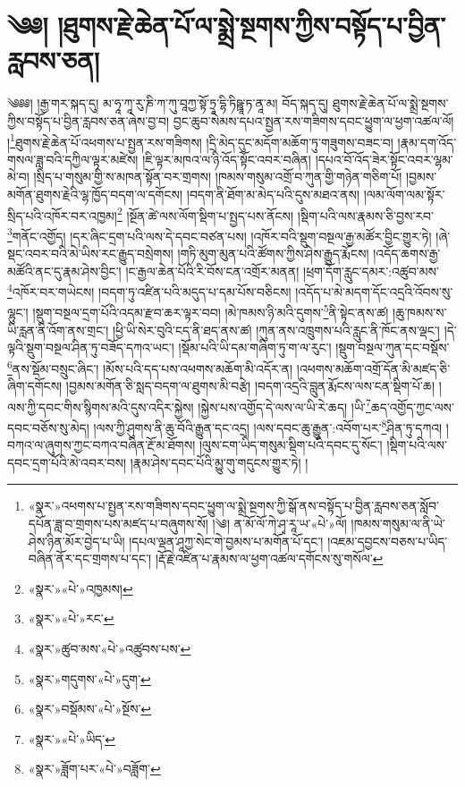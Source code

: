 \chapter{༄༅། །ཐུགས་རྗེ་ཆེན་པོ་ལ་སྨྲེ་སྔགས་ཀྱིས་བསྟོད་པ་བྱིན་རླབས་ཅན།}༄༅༅། །རྒྱ་གར་སྐད་དུ། མ་ཧཱ་ཀཱ་རུ་ཎི་ཀ་ཀུ་བཱཀྱ་སྟོ་ཏྲཱ་དྷི་ཏིཥྛཱ་ཏ་ནཱ་མ། བོད་སྐད་དུ། ཐུགས་རྗེ་ཆེན་པོ་ལ་སྨྲེ་སྔགས་ཀྱིས་བསྟོད་པ་བྱིན་རླབས་ཅན་ཞེས་བྱ་བ། བྱང་ཆུབ་སེམས་དཔའ་སྤྱན་རས་གཟིགས་དབང་ཕྱུག་ལ་ཕྱག་འཚལ་ལོ། །\footnote{«སྣར་»འཕགས་པ་སྤྱན་རས་གཟིགས་དབང་ཕྱུག་ལ་སྨྲེ་སྔགས་ཀྱི་སྒོ་ནས་བསྟོད་པ་བྱིན་རླབས་ཅན་སློབ་དཔོན་ཟླ་བ་གྲགས་པས་མཛད་པ་བཞུགས་སོ། །༄། ན་མོ་ལོ་ཀེ་ཤྭ་རཱ་ཡ་«པེ་»ལོ། །ཁམས་གསུམ་ལ་ནི་ཡེ་ཤེས་ཉིན་མོར་བྱེད་པ་ཡི། །དཔལ་ལྡན་ཤཱཀྱ་སེང་གེ་བྱམས་པ་མགོན་པོ་དང་། །འཇམ་དབྱངས་བཅས་པ་ཡིད་བཞིན་ནོར་དང་གྲགས་པ་དང་། །རྡོ་རྗེ་འཛིན་པ་རྣམས་ལ་ཕྱག་འཚལ་དགོངས་སུ་གསོལ་}ཐུགས་རྗེ་ཆེན་པོ་འཕགས་པ་སྤྱན་རས་གཟིགས། །དྲི་མེད་དུང་མདོག་མཆོག་ཏུ་གཟུགས་བཟང་བ། །རྣམ་དག་འོད་གསལ་ཟླ་བའི་དཀྱིལ་ལྟར་མཛེས། །ཇི་ལྟར་མཁའ་ལ་ཉི་འོད་སྟོང་འབར་བཞིན། །དཔའ་བོ་འོད་ཟེར་སྟོང་འབར་ལྷམ་མེ་བ། །སྲིད་པ་གསུམ་གྱི་ས་མཁན་སྟོན་བར་གྲགས། །ཁམས་གསུམ་འགྲོ་བ་ཀུན་གྱི་གཉེན་གཅིག་པོ། །བྱམས་མགོན་ཐུགས་རྗེའི་ལྷ་ཁྱོད་བདག་ལ་དགོངས། །བདག་ནི་ཐོག་མ་མེད་པའི་དུས་མཐའ་ནས། །ལམ་ལོག་ལམ་སྟོར་སྲིད་པའི་འཁོར་བར་འཁྱམ།\footnote{«སྣར་»«པེ་»འཁྱམས།} །སྔོན་ཚེ་ལས་ལོག་སྡིག་པ་སྤྱད་པས་ནོངས། །སྡིག་པའི་ལས་རྣམས་ཅི་བྱས་རབ་\footnote{«སྣར་»«པེ་»རང་}གནོང་འགྱོད། །དར་ཞིང་དྲག་པའི་ལས་དེ་དབང་བཙན་པས། །འཁོར་བའི་སྡུག་བསྔལ་རྒྱ་མཚོར་བྱིང་གྱུར་ཏེ། །ཞེ་སྡང་འབར་བའི་མེ་ཡིས་རང་རྒྱུད་བསྲེགས། །གཏི་མུག་མུན་པའི་ཚོགས་ཀྱིས་ཤེས་རྒྱུད་རྨོངས། །འདོད་ཆགས་རྒྱ་མཚོའི་ནང་དུ་རྣམ་ཤེས་བྱིང་། །ང་རྒྱལ་ཆེན་པོའི་རི་བོས་ངན་འགྲོར་མནན། །ཕྲག་དོག་རླུང་དམར་:འཚུབ་མས་\footnote{«སྣར་»ཚུབ་མས་«པེ་»འཚུབས་པས་}འཁོར་བར་གཡེངས། །བདག་ཏུ་འཛིན་པའི་མདུད་པ་དམ་པོས་བཅིངས། །འདོད་པ་མེ་མདག་དོང་འདྲའི་འོབས་སུ་ལྷུང་། །སྡུག་བསྔལ་དྲག་པོའི་འདམ་རྫབ་ཆར་ལྟར་བབ། །མེ་ཁམས་ཉི་མའི་དུགས་\footnote{«སྣར་»གདུགས་«པེ་»དུག་}ནི་སྟེང་ནས་ཚ། །ཆུ་ཁམས་ས་ཡི་རླན་ནི་འོག་ནས་གྲང་། །ཕྱི་ཡི་སེར་བུའི་ངད་ནི་ཐད་ནས་ཚ། །ཀུན་ནས་འཁྲུགས་པའི་རླུང་ནི་ཁོང་ནས་ལྡང་། །དེ་ལྟའི་སྡུག་བསྔལ་ཤིན་ཏུ་བཟོད་དཀའ་ཡང་། །སྡོམ་པའི་ཡི་དམ་གཞིག་ཏུ་ག་ལ་རུང་། །སྡུག་བསྔལ་ཀུན་དང་བསྡོས་\footnote{«སྣར་»བསྡོམས་«པེ་»སྔོས་}ནས་སྡོམ་བསྲུང་ཞིང་། །མོས་པའི་དད་པས་འཕགས་མཆོག་མི་འདོར་ན། །འཕགས་མཆོག་འགྲོ་དོན་མི་མཛད་ཅི་ཞིག་དགོངས། །བྱམས་མགོན་ཅི་སླད་བདག་ལ་ཐུགས་མི་བརྩེ། །བདག་འདྲའི་བླུན་རྨོངས་ལས་ངན་སྡིག་པོ་ཆ། །ལས་ཀྱི་དབང་གིས་སྙིགས་མའི་དུས་འདིར་སྐྱེས། །སྐྱེས་པས་འགྱོད་དེ་ལས་ལ་ཡི་རེ་ཆད། །ཡི་\footnote{«སྣར་»«པེ་»ཡིད་}ཆད་འགྱོད་ཀྱང་ལས་དབང་བཅོས་སུ་མེད། །ལས་ཀྱི་ཤུགས་ནི་ཆུ་བོའི་རྒྱུན་དང་འདྲ། །ལས་དབང་ཆུ་རྒྱུན་:འབོག་པར་\footnote{«སྣར་»ཟློག་པར་«པེ་»བཟློག་}ཤིན་ཏུ་དཀའ། །བཀའ་ལ་ཞུགས་ཀྱང་བཀའ་བཞིན་རྔོ་མ་ཐོགས། །ལུས་ངག་ཡིད་གསུམ་སྡིག་པའི་དབང་དུ་སོང་། །སྡིག་པའི་ལས་དབང་དྲག་པོའི་མེ་འབར་བས། །རྣམ་ཤེས་དབང་པོའི་མྱུ་གུ་གདུངས་གྱུར་ཏེ། །
